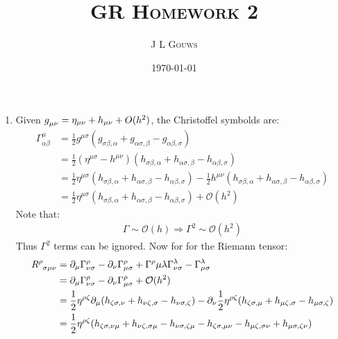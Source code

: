 \documentclass[12pt,a4]{article}
\title{
\textsc{GR Homework 2}
}
\author{\textsc{J L Gouws}
}
\date{\today
\\[1cm]}
\begin{document}
\thispagestyle{empty}

\maketitle

\begin{enumerate}
  \item
    Given $\tensor{g}{_\mu_\nu} = \eta_{\mu\nu} + h_{\mu\nu} + O(h^2)$, the Christoffel symbolds are:
    \begin{align*}
      \Gamma^\mu_{\alpha \beta} &= \frac{1}{2} g^{\mu \sigma} (g_{\sigma\beta, \alpha} + g_{\alpha\sigma, \beta} - g_{\alpha\beta, \sigma})\\
                                  &= \frac{1}{2} (\eta^{\mu \sigma} - h^{\mu\nu}) (h_{\sigma\beta, \alpha} + h_{\alpha\sigma, \beta} - h_{\alpha\beta, \sigma})\\
                                  &= \frac{1}{2} \eta^{\mu \sigma} (h_{\sigma\beta, \alpha} + h_{\alpha\sigma, \beta} - h_{\alpha\beta, \sigma}) - \frac{1}{2} h^{\mu\nu} (h_{\sigma\beta, \alpha} + h_{\alpha\sigma, \beta} - h_{\alpha\beta, \sigma})\\
                                  &= \frac{1}{2} \eta^{\mu \sigma} (h_{\sigma\beta, \alpha} + h_{\alpha\sigma, \beta} - h_{\alpha\beta, \sigma}) + \mathcal{O}(h^2)
    \end{align*}
    Note that:
    \begin{align*}
      \Gamma \sim \mathcal{O}(h) \Rightarrow \Gamma^2 \sim \mathcal{O} (h^2)
    \end{align*}
    Thus $\Gamma^2$ terms can be ignored.
    Now for for the Riemann tensor:
    \begin{align*}
      \tensor{R}{^\rho_\sigma_\mu_\nu} &= \partial_\mu \Gamma^\rho_{\nu\sigma } - \partial_\nu \Gamma^\rho_{\mu\sigma } + \Gamma^\rho{\mu\lambda}\Gamma^\lambda_{\nu\sigma} - \Gamma^\lambda_{\mu\sigma}\\
                                      &= \partial_\mu \Gamma^\rho_{\nu\sigma } - \partial_\nu \Gamma^\rho_{\mu\sigma } + \mathcal{O}(h^2)\\
                                      &= \frac{1}{2}\eta^{\rho \zeta} \partial_\mu (h_{\zeta\sigma, \nu} + h_{\nu\zeta, \sigma} - h_{\nu\sigma, \zeta}) - \partial_\nu \frac{1}{2} \eta^{\rho \zeta} (h_{\zeta\sigma, \mu} + h_{\mu\zeta, \sigma} - h_{\mu\sigma, \zeta})\\
                                      &= \frac{1}{2}\eta^{\rho \zeta} (h_{\zeta\sigma, \nu\mu} + h_{\nu\zeta, \sigma\mu} - h_{\nu\sigma, \zeta\mu} - h_{\zeta\sigma, \mu\nu} - h_{\mu\zeta, \sigma\nu} + h_{\mu\sigma, \zeta\nu})\\

\end{align*}
\end{enumerate}
\end{document}
